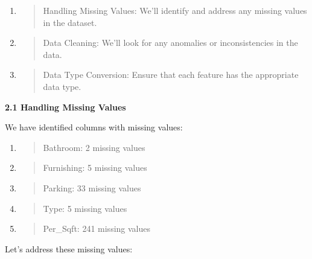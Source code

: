 \documentclass[]{article}
\begin{document}
\begin{enumerate}
\def\labelenumi{\arabic{enumi}.}
\item
  \begin{quote}
  Handling Missing Values: We'll identify and address any missing values
  in the dataset.
  \end{quote}
\item
  \begin{quote}
  Data Cleaning: We'll look for any anomalies or inconsistencies in the
  data.
  \end{quote}
\item
  \begin{quote}
  Data Type Conversion: Ensure that each feature has the appropriate
  data type.
  \end{quote}
\end{enumerate}

\textbf{2.1 Handling Missing Values}

We have identified columns with missing values:

\begin{enumerate}
\def\labelenumi{\arabic{enumi}.}
\item
  \begin{quote}
  Bathroom: 2 missing values
  \end{quote}
\item
  \begin{quote}
  Furnishing: 5 missing values
  \end{quote}
\item
  \begin{quote}
  Parking: 33 missing values
  \end{quote}
\item
  \begin{quote}
  Type: 5 missing values
  \end{quote}
\item
  \begin{quote}
  Per\_Sqft: 241 missing values
  \end{quote}
\end{enumerate}

Let's address these missing values:
\end{document}
